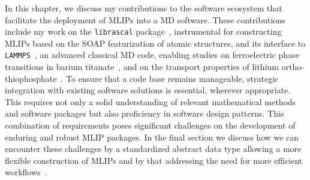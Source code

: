 In this chapter, we discuss my contributions to the software ecosystem that facilitate the deployment of MLIPs into a MD software.
These contributions include my work on the \texttt{librascal} package~\cite{LIBRASCAL}, instrumental for constructing MLIPs based on the SOAP featurization of atomic structures, and its interface to \texttt{LAMMPS}~\cite{LAMMPS}, an advanced classical MD code, enabling 
 studies on ferroelectric phase transitions in barium titanate~\cite{gigli2023modeling}, and on the transport properties of lithium ortho-thiophosphate~\cite{gigli2023mechanism}.
To ensure that a code base remains manageable, strategic integration with existing software solutions is essential, wherever appropriate.
This requires not only a solid understanding of relevant mathematical methods and software packages but also proficiency in software design patterns.
This combination of requirements poses significant challenges on the development of enduring and robust MLIP packages.
In the final section we discuss how we can encounter these challenges by a standardized abstract data type allowing a more flexible construction of MLIPs and by that addressing the need for more efficient workflows~\cite{chang_simulations_2023}.


